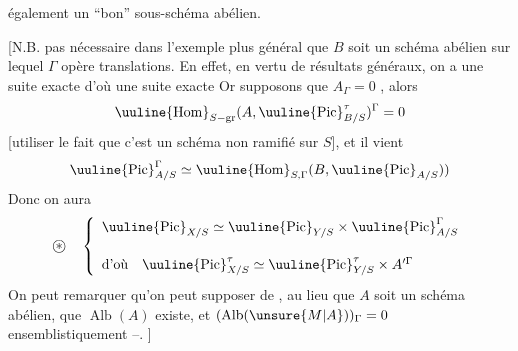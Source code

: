 également un ``bon'' sous-schéma abélien.

\margin{$\unsure{\rho}$}
[N.B.  pas nécessaire dans  l'exemple plus général que $B$ soit un schéma abélien sur lequel $\Gamma$ opère  translations.
En effet, en vertu de résultats généraux, on a une suite exacte
d'où une suite exacte
Or  supposons que $A_{\Gamma}=0$  , alors
\[
\uuline{\operatorname{Hom}}_{S-\mathrm{gr}}(A,\uuline{\operatorname{Pic}}_{B/S}^{\tau})^{\Gamma}=0
\]
[utiliser le fait que c'est un schéma non ramifié sur $S$], et il vient
\[
\uuline{\operatorname{Pic}}_{A/S}^{\Gamma}\simeq\uuline{\operatorname{Hom}}_{S,\Gamma}(B,\uuline{\operatorname{Pic}}_{A/S}))
\]
Donc on aura
\[
\text{\textcircled{$*$}}\quad\left\{\begin{array}{l}
\uuline{\operatorname{Pic}}_{X/S}\simeq\uuline{\operatorname{Pic}}_{Y/S}\times\uuline{\operatorname{Pic}}_{A/S}^{\Gamma}\\[1.5em]
\text{d'où}\quad\uuline{\operatorname{Pic}}_{X/S}^{\tau}\simeq\uuline{\operatorname{Pic}}_{Y/S}^{\tau}\times A'^{\Gamma}
\end{array}\right.
\]
\deleted{]}
On peut remarquer qu'on peut supposer de \unsure{$=$}, au lieu que $A$ soit un schéma abélien, que $\operatorname{Alb}(A)$ existe, et $(\operatorname{Alb}(\unsure{M|A}))_{\Gamma}=0$ ensemblistiquement --.
]
